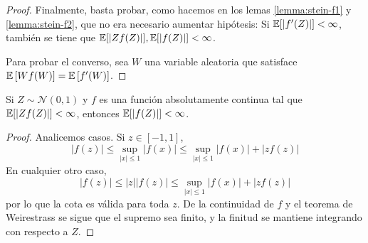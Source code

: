 \documentclass[main.tex]{subfiles}
\begin{document}
\begin{theorem}
\begin{proof}
        
        Finalmente, basta probar, como hacemos en los lemas \eqref{lemma:stein-f1} y \eqref{lemma:stein-f2}, que no era necesario aumentar hipótesis: Si $\operatorname{\mathbb{E}}[|f'(Z)|] < \infty$, también se tiene que $ \operatorname{\mathbb{E}}[|Zf(Z)|], \operatorname{\mathbb{E}}[|f(Z)|] < \infty$.

        Para probar el converso, sea $W$ una variable aleatoria que satisface $\operatorname{\mathbb{E}}\left[Wf(W)\right] = \operatorname{\mathbb{E}}\left[f'(W)\right]$. 
    \end{proof}
\end{theorem}

\begin{lemma}\label{lemma:stein-f1}
    Si $Z\sim \mathcal{N}(0, 1)$ y $f$ es una función absolutamente continua tal que $\operatorname{\mathbb{E}}[|Zf(Z)|] < \infty$, entonces $\operatorname{\mathbb{E}}[| f(Z) |] < \infty$.
    \begin{proof}
        Analicemos casos. Si $z \in [-1, 1]$, 
        \begin{equation*}
            |f(z)| \leq \sup_{|x|\leq 1} |f(x)| \leq \sup_{|x|\leq 1} |f(x)| + |zf(z)|
        \end{equation*}
        En cualquier otro caso, 
        \begin{equation*}
            |f(z)| \leq |z||f(z)| \leq  \sup_{|x|\leq 1} |f(x)| + |zf(z)|
        \end{equation*}
        por lo que la cota es válida para toda $z$. De la continuidad de $f$ y el teorema de Weirestrass se sigue que el supremo sea finito, y la finitud se mantiene integrando con respecto a $Z$.
    \end{proof}
\end{lemma}
\end{document}
